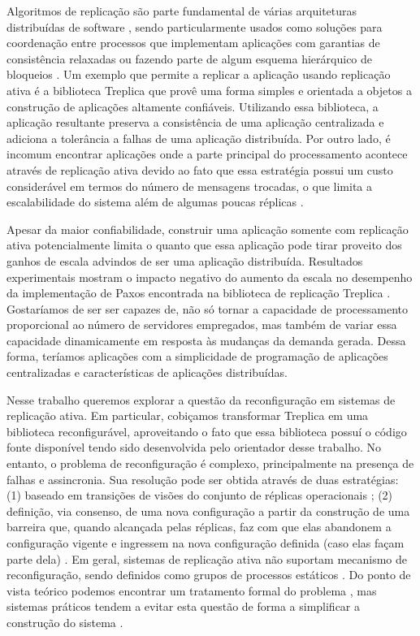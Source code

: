 Algoritmos de replicação são parte fundamental de várias arquiteturas distribuídas de
software \cite{chandra07, hupfeld08b, maccormick04}, sendo particularmente usados como
soluções para coordenação entre processos que implementam aplicações com garantias de
consistência relaxadas \cite{burrows06} ou fazendo parte de algum esquema hierárquico de
bloqueios \cite{lampson96}. Um exemplo que permite a replicar a aplicação usando
replicação ativa é a biblioteca Treplica \cite{vieira08a, vieira-tr10b} que provê uma
forma simples e orientada a objetos a construção de aplicações altamente confiáveis.
Utilizando essa biblioteca, a aplicação resultante preserva a consistência de uma
aplicação centralizada e adiciona a tolerância a falhas de uma aplicação distribuída. Por
outro lado, é incomum encontrar aplicações onde a parte principal do processamento
acontece através de replicação ativa devido ao fato que essa estratégia possui um custo
considerável em termos do número de mensagens trocadas, o que limita a escalabilidade do
sistema além de algumas poucas réplicas \cite{lampson96}.

Apesar da maior confiabilidade, construir uma aplicação somente com replicação ativa
potencialmente limita o quanto que essa aplicação pode tirar proveito dos ganhos de escala
advindos de ser uma aplicação distribuída. Resultados experimentais mostram o impacto
negativo do aumento da escala no desempenho da implementação de Paxos encontrada na
biblioteca de replicação Treplica \cite{vieira09}. Gostaríamos de ser ser capazes de, não
só tornar a capacidade de processamento proporcional ao número de servidores empregados,
mas também de variar essa capacidade dinamicamente em resposta às mudanças da demanda
gerada. Dessa forma, teríamos aplicações com a simplicidade de programação de aplicações
centralizadas e características de aplicações distribuídas.

Nesse trabalho queremos explorar a questão da reconfiguração em sistemas de replicação
ativa. Em particular, cobiçamos transformar Treplica em uma biblioteca reconfigurável,
aproveitando o fato que essa biblioteca possuí o código fonte disponível tendo sido
desenvolvida pelo orientador desse trabalho. No entanto, o problema de reconfiguração é
complexo, principalmente na presença de falhas e assincronia. Sua resolução pode ser
obtida através de duas estratégias: (1) baseado em transições de visões do conjunto de
réplicas operacionais \cite{birman87a, birman87b}; (2) definição, via consenso, de uma
nova configuração a partir da construção de uma barreira que, quando alcançada pelas
réplicas, faz com que elas abandonem a configuração vigente e ingressem na nova
configuração definida (caso elas façam parte dela) \cite{lamport10}. Em geral, sistemas de
replicação ativa não suportam mecanismo de reconfiguração, sendo definidos como grupos de
processos estáticos \cite{chandra96, lamport98}. Do ponto de vista teórico podemos
encontrar um tratamento formal do problema \cite{lamport10}, mas sistemas práticos tendem
a evitar esta questão de forma a simplificar a construção do sistema \cite{chandra07}.

